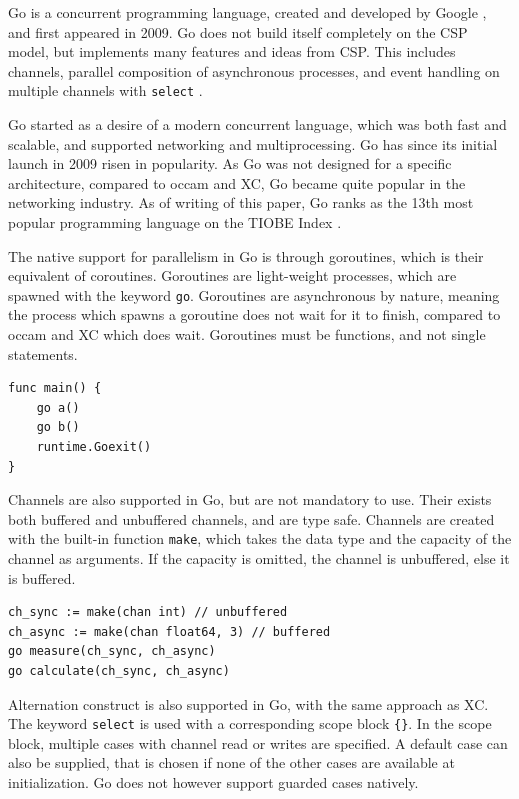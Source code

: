 Go is a concurrent programming language, created and developed by Google \citep{golangintro}, and first appeared in 2009. Go does not build itself completely on the CSP model, but implements many features and ideas from CSP. This includes channels, parallel composition of asynchronous processes, and event handling on multiple channels with \texttt{select} \citep{golangspec}.

Go started as a desire of a modern concurrent language, which was both fast and scalable, and supported networking and multiprocessing. Go has since its initial launch in 2009 risen in popularity. As Go was not designed for a specific architecture, compared to occam and XC, Go became quite popular in the networking industry. As of writing of this paper, Go ranks as the 13th most popular programming language on the TIOBE Index \citep{gopopularity}.

The native support for parallelism in Go is through goroutines, which is their equivalent of coroutines. Goroutines are light\hyp{}weight processes, which are spawned with the keyword \texttt{go}. Goroutines are asynchronous by nature, meaning the process which spawns a goroutine does not wait for it to finish, compared to occam and XC which does wait. Goroutines must be functions, and not single statements.

\begin{lstlisting}[style={Golang},frame={},numbers={none},xleftmargin={4em}]
func main() {
    go a()
    go b()
    runtime.Goexit()
}
\end{lstlisting}

Channels are also supported in Go, but are not mandatory to use. Their exists both buffered and unbuffered channels, and are type safe. Channels are created with the built\hyp{}in function \texttt{make}, which takes the data type and the capacity of the channel as arguments. If the capacity is omitted, the channel is unbuffered, else it is buffered.

\begin{lstlisting}[style={Golang},frame={},numbers={none},xleftmargin={4em}]
ch_sync := make(chan int) // unbuffered
ch_async := make(chan float64, 3) // buffered
go measure(ch_sync, ch_async)
go calculate(ch_sync, ch_async)
\end{lstlisting}

Alternation construct is also supported in Go, with the same approach as XC. The keyword \texttt{select} is used with a corresponding scope block \texttt{\{\}}. In the scope block, multiple cases with channel read or writes are specified. A default case can also be supplied, that is chosen if none of the other cases are available at initialization. Go does not however support guarded cases natively.

